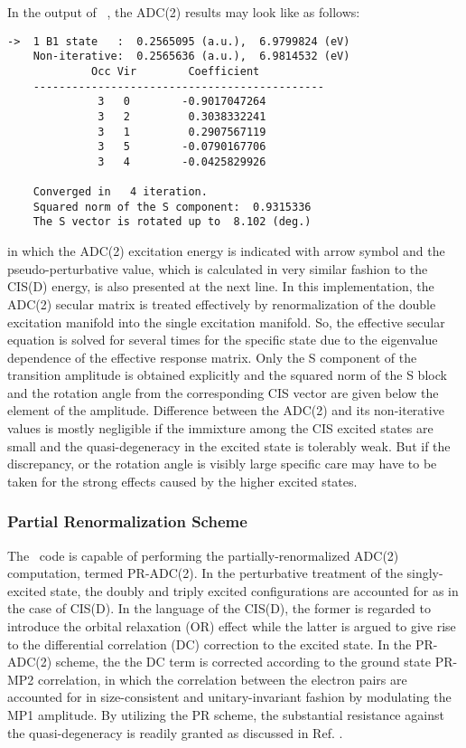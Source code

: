 In the output of \PSIadc\ , the ADC(2) results may look like as follows:
\begin{verbatim}
->  1 B1 state   :  0.2565095 (a.u.),  6.9799824 (eV)
    Non-iterative:  0.2565636 (a.u.),  6.9814532 (eV)
             Occ Vir        Coefficient
    ---------------------------------------------
              3   0        -0.9017047264
              3   2         0.3038332241
              3   1         0.2907567119
              3   5        -0.0790167706
              3   4        -0.0425829926
              
    Converged in   4 iteration.
    Squared norm of the S component:  0.9315336
    The S vector is rotated up to  8.102 (deg.)
\end{verbatim} 
in which the ADC(2) excitation energy is indicated with arrow symbol and the pseudo-perturbative value, which is calculated in very similar fashion to the CIS(D) energy, is also presented at the next line. In this implementation, the ADC(2) secular matrix is treated effectively by renormalization of the double excitation manifold into the single excitation manifold. So, the effective secular equation is solved for several times for the specific state due to the eigenvalue dependence of the effective response matrix. Only the S component of the transition amplitude is obtained explicitly and the squared norm of the S block and the rotation angle from the corresponding CIS vector are given below the element of the amplitude. Difference between the ADC(2) and its non-iterative values is mostly negligible if the immixture among the CIS excited states are small and the quasi-degeneracy in the excited state is tolerably weak. But if the discrepancy, or the rotation angle is visibly large specific care may have to be taken for the strong effects caused by the higher excited states. 

\subsubsection{Partial Renormalization Scheme}
The \PSIadc\ code is capable of performing the partially-renormalized ADC(2) computation, termed PR-ADC(2). In the perturbative treatment of the singly-excited state, the doubly and triply excited configurations are accounted for as in the case of CIS(D). In the language of the CIS(D), the former is regarded to introduce the orbital relaxation (OR) effect while the latter is argued to give rise to the differential correlation (DC) correction to the excited state. In the PR-ADC(2) scheme, the the DC term is corrected according to the ground state PR-MP2 correlation, in which the correlation between the electron pairs are accounted for in size-consistent and unitary-invariant fashion by modulating the MP1 amplitude. By utilizing the PR scheme, the substantial resistance against the quasi-degeneracy is readily granted as discussed in Ref. \cite{Saitow:2012}.

